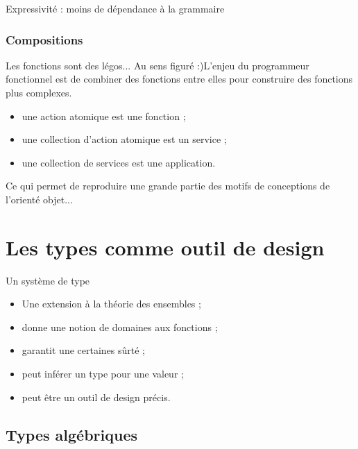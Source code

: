 \documentclass{beamer}
\begin{document}
  \begin{frame}{Expressivité : moins de dépendance à la grammaire}
    
  \end{frame}

  \subsubsection{Compositions}
  \begin{frame}{Les fonctions sont des légos...}
    Au sens figuré :)\newline L'enjeu du programmeur fonctionnel est de combiner des fonctions
    entre elles pour construire des fonctions plus complexes.
    \begin{itemize}
      \item une action atomique est une fonction ;
      \item une collection d'action atomique est un service ;
      \item une collection de services est une application.
    \end{itemize}
    Ce qui permet de reproduire une grande partie des motifs de conceptions
    de l'orienté objet...
  \end{frame}

  \section{Les types comme outil de design}
  \begin{frame}{Un système de type}
    \begin{itemize}
      \item Une extension à la théorie des ensembles ;
      \item donne une notion de domaines aux fonctions ;
      \item garantit une certaines sûrté ;
      \item peut inférer un type pour une valeur ;
      \item peut être un outil de design précis.
    \end{itemize}
  \end{frame}

  \subsection{Types algébriques}
\end{document}
